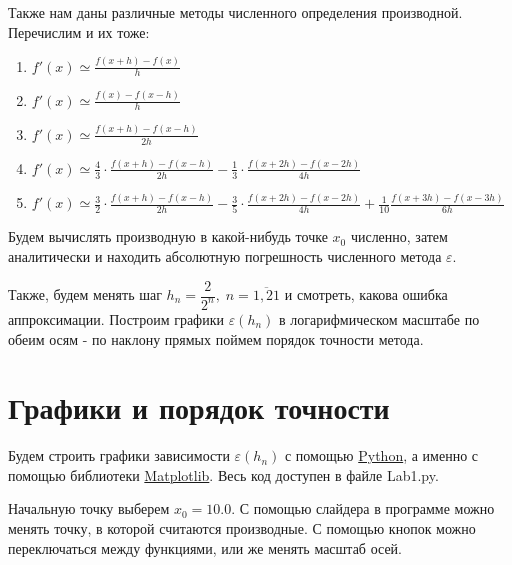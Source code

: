 		Также нам даны различные методы численного определения производной. Перечислим и их тоже:
		\begin{enumerate}
			\item $f'(x) \simeq \frac{f(x + h) - f(x)}{h}$
			
			\item $f'(x) \simeq \frac{f(x) - f(x - h)}{h}$
			
			\item $f'(x) \simeq \frac{f(x + h) - f(x - h)}{2h}$
			
			\item $f'(x) \simeq \frac{4}{3} \cdot \frac{f(x + h) - f(x - h)}{2h} - \frac{1}{3} \cdot \frac{f(x + 2h) - f(x - 2h)}{4h}$
			
			\item $f'(x) \simeq \frac{3}{2} \cdot \frac{f(x + h) - f(x - h)}{2h} - \frac{3}{5} \cdot \frac{f(x + 2h) - f(x - 2h)}{4h} + \frac{1}{10} \frac{f(x + 3h) - f(x - 3h)}{6h}$
		\end{enumerate}
	
	
		Будем вычислять производную в какой-нибудь точке $x_0$ численно, затем аналитически и находить абсолютную погрешность численного метода $\varepsilon$.
		
		Также, будем менять шаг $h_n = \dfrac{2}{2^n}, \; n = \overline{1, 21}$ и смотреть, какова ошибка аппроксимации. Построим графики $\varepsilon(h_n)$ в логарифмическом масштабе по обеим осям - по наклону прямых поймем порядок точности метода.
		
		\newpage
		\section*{Графики и порядок точности}
		Будем строить графики зависимости $\varepsilon(h_n)$ с помощью \href{https://www.python.org/}{Python}, а именно с помощью библиотеки \href{https://matplotlib.org/stable/tutorials/introductory/pyplot.html}{Matplotlib}. Весь код доступен в файле Lab1.py.
		
		Начальную точку выберем $x_0 = 10.0$. С помощью слайдера в программе можно менять точку, в которой считаются производные. С помощью кнопок можно переключаться между функциями, или же менять масштаб осей.
		
